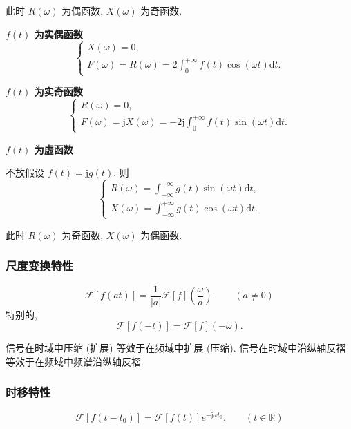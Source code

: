 此时 $R(\omega)$ 为偶函数, $X(\omega)$ 为奇函数.

\textbf{$f(t)$ 为实偶函数}
\begin{equation}
    \begin{cases}
        X(\omega)=0, \\
        F(\omega)=R(\omega)=2\int_{0}^{+\infty}f(t)\cos(\omega t)\mathrm{d}t.
    \end{cases}
\end{equation}

\textbf{$f(t)$ 为实奇函数}
\begin{equation}
    \begin{cases}
        R(\omega)=0, \\
        F(\omega)=\mathrm{j}X(\omega)=-2\mathrm{j}\int_{0}^{+\infty}f(t)\sin(\omega t)\mathrm{d}t.
    \end{cases}
\end{equation}

\textbf{$f(t)$ 为虚函数}

不放假设 $f(t)=\mathrm{j}g(t)$. 则
\begin{equation}
    \begin{cases}
        R(\omega)=\int_{-\infty}^{+\infty}g(t)\sin(\omega t)\mathrm{d}t, \\
        X(\omega)=\int_{-\infty}^{+\infty}g(t)\cos(\omega t)\mathrm{d}t.
    \end{cases}
\end{equation}

此时 $R(\omega)$ 为奇函数, $X(\omega)$ 为偶函数.

\subsubsection{尺度变换特性}
\rmg
\begin{equation}
    \mathcal{F}[f(at)]=\frac{1}{|a|}\mathcal{F}[f]\left(\frac{\omega}{a}\right).\qquad (a\neq 0)
\end{equation}
特别的,
\begin{equation*}
    \mathcal{F}[f(-t)]=\mathcal{F}[f](-\omega).
\end{equation*}

信号在时域中压缩 (扩展) 等效于在频域中扩展 (压缩). 信号在时域中沿纵轴反褶等效于在频域中频谱沿纵轴反褶.

\subsubsection{时移特性}
\rmg
\begin{equation}
    \mathcal{F}[f(t-t_0)]=\mathcal{F}[f(t)]e^{-\mathrm{j}\omega t_0}.\qquad (t\in\mathbb{R})
\end{equation}

